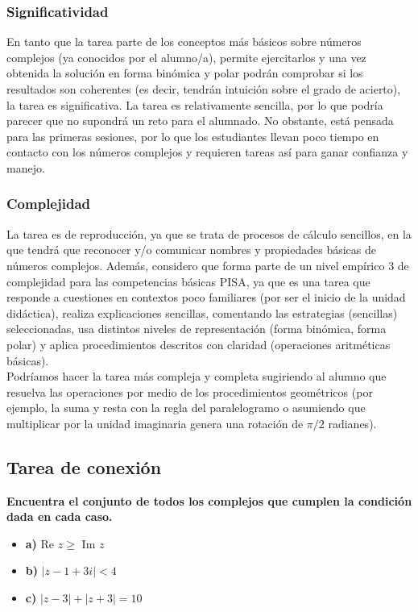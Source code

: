 \documentclass[../main.tex]{memoir}
\begin{document}
\subsubsection{Significatividad}
En tanto que la tarea parte de los conceptos más básicos sobre números complejos (ya conocidos por el alumno/a), permite ejercitarlos y una vez obtenida la solución en forma binómica y polar podrán comprobar si los resultados son coherentes (es decir, tendrán intuición sobre el grado de acierto), la tarea es significativa. La tarea es relativamente sencilla, por lo que podría parecer que no supondrá un reto para el alumnado. No obstante, está pensada para las primeras sesiones, por lo que los estudiantes llevan poco tiempo en contacto con los números complejos y requieren tareas así para ganar confianza y manejo.

\subsubsection{Complejidad}
La tarea es de reproducción, ya que se trata de procesos de cálculo sencillos, en la que tendrá que reconocer y/o comunicar nombres y propiedades básicas de números complejos. Además, considero que forma parte de un nivel empírico 3 de complejidad para las competencias básicas PISA, ya que es una tarea que responde a cuestiones en contextos poco familiares (por ser el inicio de la unidad didáctica), realiza explicaciones sencillas, comentando las estrategias (sencillas) seleccionadas, usa distintos niveles de representación (forma binómica, forma polar) y aplica procedimientos descritos con claridad (operaciones aritméticas básicas). \\

Podríamos hacer la tarea más compleja y completa sugiriendo al alumno que resuelva las operaciones por medio de los procedimientos geométricos (por ejemplo, la suma y resta con la regla del paralelogramo o asumiendo que multiplicar por la unidad imaginaria genera una rotación de $\pi/2$ radianes).

\subsection{Tarea de conexión}

\textbf{Encuentra el conjunto de todos los complejos que cumplen la condición dada en cada caso.}

\begin{itemize}
	\item \textbf{a)} Re $z \geq$ Im $z$
	\item \textbf{b)} $|z-1+3i| < 4$
	\item \textbf{c)} $|z-3| + |z+3| = 10$
\end{itemize}
\end{document}
